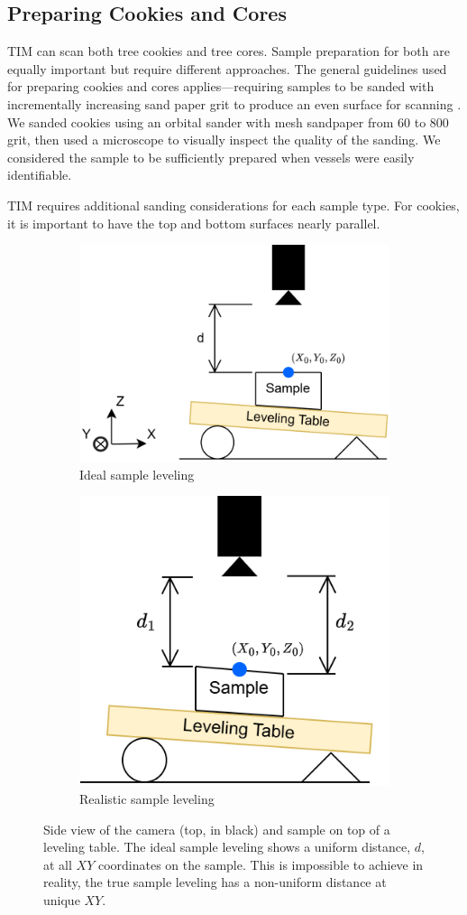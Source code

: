 \documentclass[a4paper,12pt]{article}
\begin{document}
\subsection{Preparing Cookies and Cores}
TIM can scan both tree cookies and tree cores. Sample preparation for both are equally important but require different approaches.
The general guidelines used for preparing cookies and cores applies---requiring samples to be sanded with incrementally increasing sand paper grit to produce an even surface for scanning \citep{speer_fundamentals_2010}. We sanded cookies using an orbital sander with mesh sandpaper from 60 to 800 grit, then used a microscope to visually inspect the quality of the sanding. We considered the sample to be sufficiently prepared when vessels were easily identifiable.

TIM requires additional sanding considerations for each sample type. 
For cookies, it is important to have the top and bottom surfaces nearly parallel. 
\begin{figure}
  \centering
  \begin{subfigure}{.5\textwidth}
    \centering
    \includegraphics[height=0.5\linewidth]{../diagrams/sample_setup_ideal.png}
    \caption{Ideal sample leveling}
    \label{fig:ideal_levelling}
  \end{subfigure}%
  \begin{subfigure}{.5\textwidth}
    \centering
    \includegraphics[height=0.5\linewidth]{../diagrams/sample_setup_realistic.png}
    \caption{Realistic sample leveling}
    \label{fig:realistic_levelling}
  \end{subfigure}
  \caption{Side view of the camera (top, in black) and sample on top of a leveling table. The ideal sample leveling shows a uniform distance, $d$, at all $XY$ coordinates on the sample. This is impossible to achieve in reality, the true sample leveling has a non-uniform distance at unique $XY$.}
  \label{fig:sample_levelling}
\end{figure}
\end{document}
